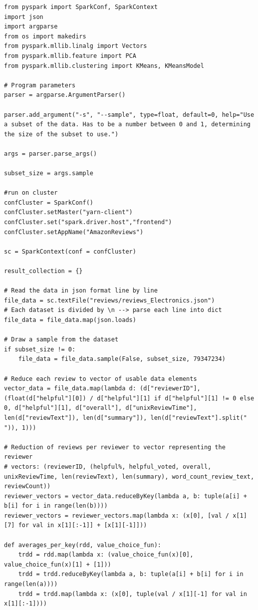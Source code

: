 \documentclass{scrartcl}
\theoremstyle{my_th_style}
\begin{document}
\begin{lstlisting}[breaklines=true]
from pyspark import SparkConf, SparkContext
import json
import argparse
from os import makedirs
from pyspark.mllib.linalg import Vectors
from pyspark.mllib.feature import PCA
from pyspark.mllib.clustering import KMeans, KMeansModel

# Program parameters
parser = argparse.ArgumentParser()

parser.add_argument("-s", "--sample", type=float, default=0, help="Use a subset of the data. Has to be a number between 0 and 1, determining the size of the subset to use.")

args = parser.parse_args()

subset_size = args.sample

#run on cluster
confCluster = SparkConf()
confCluster.setMaster("yarn-client")
confCluster.set("spark.driver.host","frontend")
confCluster.setAppName("AmazonReviews")

sc = SparkContext(conf = confCluster)

result_collection = {}

# Read the data in json format line by line
file_data = sc.textFile("reviews/reviews_Electronics.json")
# Each dataset is divided by \n --> parse each line into dict
file_data = file_data.map(json.loads)

# Draw a sample from the dataset
if subset_size != 0:
	file_data = file_data.sample(False, subset_size, 79347234)

# Reduce each review to vector of usable data elements
vector_data = file_data.map(lambda d: (d["reviewerID"], (float(d["helpful"][0]) / d["helpful"][1] if d["helpful"][1] != 0 else 0, d["helpful"][1], d["overall"], d["unixReviewTime"], len(d["reviewText"]), len(d["summary"]), len(d["reviewText"].split(" ")), 1)))

# Reduction of reviews per reviewer to vector representing the reviewer
# vectors: (reviewerID, (helpful%, helpful_voted, overall, unixReviewTime, len(reviewText), len(summary), word_count_review_text, reviewCount))
reviewer_vectors = vector_data.reduceByKey(lambda a, b: tuple(a[i] + b[i] for i in range(len(b))))
reviewer_vectors = reviewer_vectors.map(lambda x: (x[0], [val / x[1][7] for val in x[1][:-1]] + [x[1][-1]]))

def averages_per_key(rdd, value_choice_fun):
	trdd = rdd.map(lambda x: (value_choice_fun(x)[0], value_choice_fun(x)[1] + [1]))
	trdd = trdd.reduceByKey(lambda a, b: tuple(a[i] + b[i] for i in range(len(a))))
	trdd = trdd.map(lambda x: (x[0], tuple(val / x[1][-1] for val in x[1][:-1])))
	

\end{lstlisting}
\end{document}
